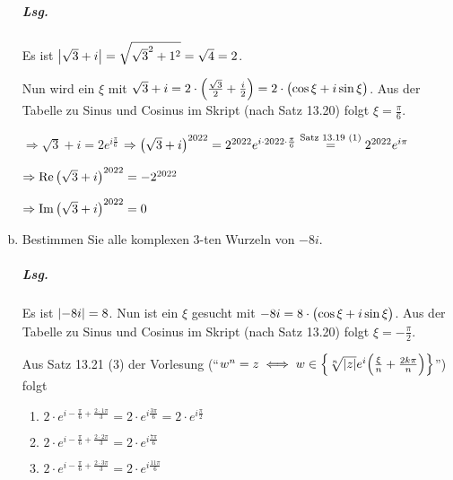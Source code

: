 \documentclass{scrreprt}
\begin{document}
\begin{enumerate}[(a)]
  \subparagraph{Lsg.} Es ist $\abs{\sqrt{3} + i} = \sqrt{\sqrt{3}^2 + 1^2}
  = \sqrt{4} = 2$.

  Nun wird ein $\xi$ mit
  $\sqrt{3} + i = 2 \cdot \qty\Big(\frac{\sqrt{3}}{2} + \frac{i}{2})
  = 2 \cdot \qty\big(\cos \xi + i \sin \xi)$.
  Aus der Tabelle zu Sinus und Cosinus im Skript (nach Satz 13.20) folgt
  $\xi = \frac{\pi}{6}$.

  $\Rightarrow \sqrt{3} + i = 2 e^{i \frac{\pi}{6}}$
  $\Rightarrow \qty\big(\sqrt{3} + i)^{2022}
  = 2^{2022} e^{i \cdot 2022 \cdot \frac{\pi}{6}}
  \overset{\text{Satz 13.19 (1)}}= 2^{2022} e^{i \pi}$


  $\Rightarrow \Re \qty\big(\sqrt{3} + i)^{2022} = - 2^{2022}$

  $\Rightarrow \Im \qty\big(\sqrt{3} + i)^{2022} = 0$

\item Bestimmen Sie alle komplexen 3-ten Wurzeln von $-8i$.

  \subparagraph{Lsg.} Es ist $\abs{-8i} = 8$.
  Nun ist ein $\xi$ gesucht mit $-8i = 8 \cdot \qty\big(\cos \xi + i \sin \xi)$.
  Aus der Tabelle zu Sinus und Cosinus im Skript (nach Satz 13.20) folgt
  $\xi = -\frac{\pi}{2}$.

  Aus Satz 13.21 (3) der Vorlesung (``$w^n = z \iff
  w \in \qty{\sqrt[n]{\abs{z}}e^i\qty(\frac{\xi}{n} + \frac{2k\pi}{n})}$'')
  folgt
  \begin{enumerate}[label={$w_{\arabic*} =$}]
  \item $2 \cdot e^{i -\frac{\pi}{6} + \frac{2 \cdot 1 \pi}{3}} = 2 \cdot e^{i \frac{3\pi}{6}} = 2 \cdot e^{i \frac{\pi}{2}}$ 
  \item $2 \cdot e^{i -\frac{\pi}{6} + \frac{2 \cdot 2 \pi}{3}} = 2 \cdot e^{i \frac{7\pi}{6}}$
  \item $2 \cdot e^{i -\frac{\pi}{6} + \frac{2 \cdot 3 \pi}{3}} = 2 \cdot e^{i \frac{11\pi}{6}}$
  \end{enumerate}


\end{enumerate}
\end{document}
